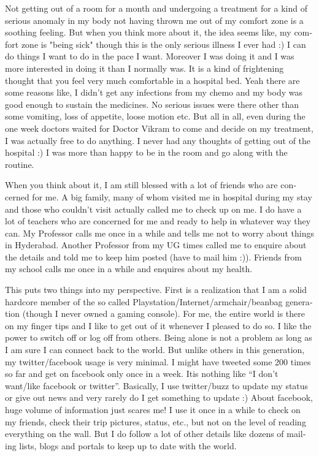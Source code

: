 \begin{english}
Not getting out of a room for a month and undergoing a treatment for a kind of serious anomaly in my body not 
having thrown me out of my comfort zone is a soothing feeling. But when you think more about it, the idea seems 
like, my comfort zone is "being sick" though this is the only serious illness I ever had :) I can do things I want to 
do in the pace I want. Moreover I was doing it and I was more interested in doing it than I normally was. It is a 
kind of frightening thought that you feel very much comfortable in a hospital bed. Yeah there are some reasons 
like, I didn't get any infections from my chemo and my body was good enough to sustain the medicines. No serious 
issues were there other than some vomiting, loss of appetite, loose motion etc. But all in all, even during the one 
week doctors waited for Doctor Vikram to come and decide on my treatment, I was actually free to do anything. 
I never had any thoughts of getting out of the hospital :) I was more than happy to be in the room and go along 
with the routine. 

When you think about it, I am still blessed with a lot of friends who are concerned for me. A big family, many of 
whom visited me in hospital during my stay and those who couldn't visit actually called me to check up on me. 
I do have a lot of teachers who are concerned for me and ready to help in whatever way they can. My Professor 
calls me once in a while and tells me not to worry about things in Hyderabad. Another Professor from my UG times 
called me to enquire about the details and told me to keep him posted (have to mail him :)). Friends from my 
school calls me once in a while and enquires about my health.

This puts two things into my perspective. First is a realization that I am a solid hardcore member of the so called 
Playstation/Internet/armchair/beanbag generation (though I never owned a gaming console). For me, the entire 
world is there on my finger tips and I like to get out of it whenever I pleased to do so. I like the power to switch off 
or log off from others. Being alone is not a problem as long as I am sure I can connect back to the world. But unlike 
others in this generation, my twitter/facebook usage is very minimal. I might have tweeted some 200 times so far 
and get on facebook only once in a week. Itis nothing like ``I don't want/like facebook or twitter''. Basically, I use 
twitter/buzz to update my status or give out news and very rarely do I get something to update :) About facebook, 
huge volume of information just scares me! I use it once in a while to check on my friends, check their trip pictures, 
status, etc., but not on the level of reading everything on the wall. But I do follow a lot of other details like dozens 
of mailing lists, blogs and portals to keep up to date with the world. 


\end{english}
